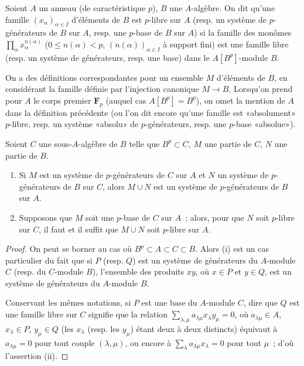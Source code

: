 \begin{definition}[21.1.9]
\label{0.21.1.9-fr}
Soient $A$ un anneau (de caractéristique $p$), $B$ une $A$-algèbre. On dit
qu'une famille $(x_\alpha)_{\alpha\in I}$ d'éléments de $B$ est $p$-libre sur
$A$ (resp. un système de $p$-générateurs de $B$ sur $A$, resp. une $p$-base
de $B$ sur $A$) si la famille des monômes
$\prod_\alpha x_\alpha^{n(\alpha)}$ ($0\leq n(\alpha)<p$,
$(n(\alpha))_{\alpha\in I}$ à support fini) est une famille libre (resp. un
système de générateurs, resp. une base) dans le $A[B^p]$-module $B$.
\end{definition}

On a des définitions correspondantes pour un ensemble $M$ d'éléments de $B$,
en considérant la famille définie par l'injection canonique $M\to B$.
Lorsqu'on prend pour $A$ le corps premier $\mathbf F_p$ (auquel cas
$A[B^p]=B^p$), on omet la mention de $A$ dans la définition précédente (ou
l'on dit encore qu'une famille est «absolument» $p$-libre, resp. un système
«absolu» de $p$-générateurs, resp. une $p$-base «absolue»).

\begin{lemma}[21.1.10]
\label{0.21.1.10-fr}
Soient $C$ une sous-$A$-algèbre de $B$ telle que $B^p\subset C$, $M$ une
partie de $C$, $N$ une partie de $B$.
\begin{enumerate}
  \item[(i)] Si $M$ est un système de $p$-générateurs de $C$ sur $A$ et $N$
  un système de $p$-générateurs de $B$ sur $C$, alors $M\cup N$ est un système
  de $p$-générateurs de $B$ sur $A$.
  \item[(ii)] Supposons que $M$ soit une $p$-base de $C$ sur $A$~; alors,
  pour que $N$ soit $p$-libre sur $C$, il faut et il suffit que $M\cup N$
  soit $p$-libre sur $A$.
\end{enumerate}
\end{lemma}

\begin{proof}
On peut se borner au cas où $B^p\subset A\subset C\subset B$. Alors (i)
est un cas particulier du fait que si $P$ (resp. $Q$) est un système de
générateurs du $A$-module $C$ (resp. du $C$-module $B$), l'ensemble des
produits $xy$, où $x\in P$ et $y\in Q$, est un système de générateurs du
$A$-module $B$.

Conservant les mêmes notations, si $P$ est une base du $A$-module $C$,
dire que $Q$ est une famille libre sur $C$ signifie que la relation
$\sum_{\lambda,\mu}a_{\lambda\mu}x_\lambda y_\mu=0$, où
$a_{\lambda\mu}\in A$, $x_\lambda\in P$, $y_\mu\in Q$ (les $x_\lambda$
(resp. les $y_\mu$) étant deux à deux distincts) équivaut à
$a_{\lambda\mu}=0$ pour tout couple $(\lambda,\mu)$, ou encore à
$\sum_\lambda a_{\lambda\mu}x_\lambda=0$ pour tout $\mu$~; d'où
l'assertion (ii).
\end{proof}

